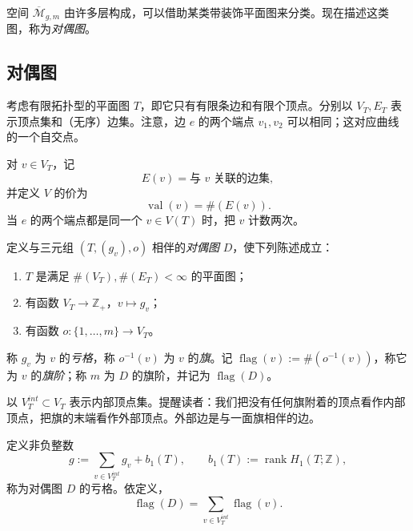 空间 $\overline{\mathcal M}_{g,m}$ 由许多层构成，可以借助某类带装饰平面图来分类。现在描述这类图，称为\emph{对偶图}。

\subsection{对偶图}
\label{subsec:dual-graphs-stable-curves}

考虑有限拓扑型的平面图 $T$，即它只有有限条边和有限个顶点。分别以 $V_T,E_T$ 表示顶点集和（无序）边集。注意，边 $e$ 的两个端点 $v_1,v_2$ 可以相同；这对应曲线的一个自交点。

\begin{definition}\label{def:edge-incidence-valence}
对 $v\in V_T$，记
\[
 E(v)=\text{与 }v\text{ 关联的边集},
\]
并定义 $V$ 的价为
\[
 \operatorname{val}(v)=\#(E(v)).
\]
当 $e$ 的两个端点都是同一个 $v\in V(T)$ 时，把 $v$ 计数两次。
\end{definition}

\begin{definition}\label{def:decorated-dual-graph}
定义与三元组 $(T,(g_v),o)$ 相伴的\emph{对偶图} $D$，使下列陈述成立：
\begin{enumerate}[label=(\arabic*)]
 \item $T$ 是满足 $\#(V_T),\#(E_T)<\infty$ 的平面图；
 \item 有函数 $V_T\to\mathbb Z_+$，$v\mapsto g_v$；
 \item 有函数 $o:\{1,\ldots,m\}\to V_T$。
\end{enumerate}
称 $g_v$ 为 $v$ 的\emph{亏格}，称 $o^{-1}(v)$ 为 $v$ 的\emph{旗}。记
$\operatorname{flag}(v):=\#(o^{-1}(v))$，称它为 $v$ 的\emph{旗阶}；称 $m$ 为 $D$ 的旗阶，并记为 $\operatorname{flag}(D)$。
\end{definition}

以 $V_T^{int}\subset V_T$ 表示内部顶点集。提醒读者：我们把没有任何旗附着的顶点看作内部顶点，把旗的末端看作外部顶点。外部边是与一面旗相伴的边。

定义非负整数
\begin{equation}
 g:=\sum_{v\in V_T^{int}}g_v+b_1(T),
 \qquad b_1(T):=\operatorname{rank}H_1(T;\mathbb Z),
 \label{eq:dual-graph-genus}
\end{equation}
称为对偶图 $D$ 的亏格。依定义，
\[
 \operatorname{flag}(D)=\sum_{v\in V_T^{int}}\operatorname{flag}(v).
\]

